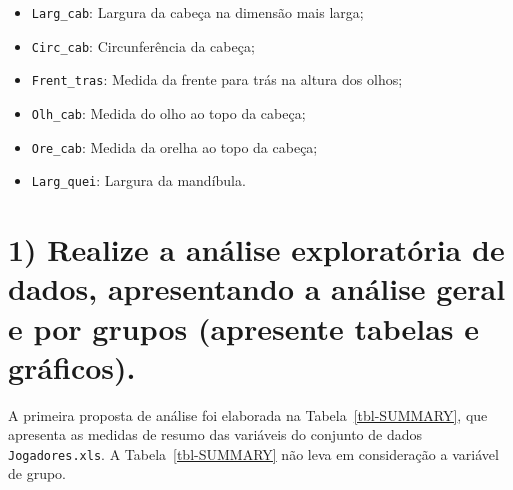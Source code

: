 \documentclass[
  portuguese,
  11pt,
]{article}
\begin{document}
{
\Large\bf
\begin{itemize}
    \item \texttt{Larg\_cab}: Largura da cabeça na dimensão mais larga;
    \item \texttt{Circ\_cab}: Circunferência da cabeça;
    \item \texttt{Frent\_tras}: Medida da frente para trás na altura dos olhos;
    \item \texttt{Olh\_cab}: Medida do olho ao topo da cabeça;
    \item \texttt{Ore\_cab}: Medida da orelha ao topo da cabeça;
    \item \texttt{Larg\_quei}: Largura da mandíbula.
\end{itemize}
}

\section*{1) Realize a análise exploratória de dados, apresentando a
análise geral e por grupos (apresente tabelas e
gráficos).}\label{realize-a-anuxe1lise-exploratuxf3ria-de-dados-apresentando-a-anuxe1lise-geral-e-por-grupos-apresente-tabelas-e-gruxe1ficos.}

A primeira proposta de análise foi elaborada na
Tabela~\ref{tbl-SUMMARY}, que apresenta as medidas de resumo das
variáveis do conjunto de dados \texttt{Jogadores.xls}. A
Tabela~\ref{tbl-SUMMARY} não leva em consideração a variável de grupo.

\begin{table}

\caption{\label{tbl-SUMMARY}Medidas de Resumo para as Variáveis do
Conjunto de Dados \texttt{Jogadores.xlsx}.}


\end{table}%
\end{document}
